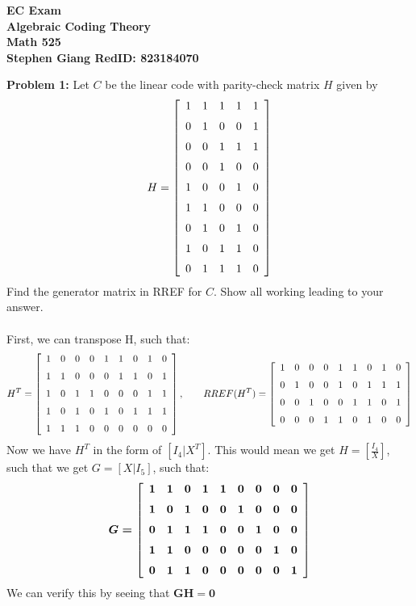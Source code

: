 \documentclass[11pt]{article}
\newcommand{\skipline}{\vspace{\baselineskip}}
\newenvironment{problem}[1]{\textbf{Problem #1: }}{\newpage}
\begin{document}
	
	\begin{center}
		\textbf{EC Exam} \\
		\textbf{Algebraic Coding Theory} \\
		\textbf{Math 525} \\
		\textbf{Stephen Giang RedID: 823184070} \\
		\skipline \skipline
	\end{center}
	
	\begin{problem}{1}
		Let $C$ be the linear code with parity-check matrix $H$ given by
		\[H =  \left[ \begin {array}{ccccc} 1&1&1&1&1\\ \noalign{\medskip}0&1&0&0&1
		\\ \noalign{\medskip}0&0&1&1&1\\ \noalign{\medskip}0&0&1&0&0
		\\ \noalign{\medskip}1&0&0&1&0\\ \noalign{\medskip}1&1&0&0&0
		\\ \noalign{\medskip}0&1&0&1&0\\ \noalign{\medskip}1&0&1&1&0
		\\ \noalign{\medskip}0&1&1&1&0\end {array} \right] 
		\]
		Find the generator matrix in RREF for $C$. Show all working leading to your answer.
		\\ \\
		First, we can transpose H, such that:
		\[H^T =  \left[ \begin {array}{ccccccccc} 1&0&0&0&1&1&0&1&0
		\\ \noalign{\medskip}1&1&0&0&0&1&1&0&1\\ \noalign{\medskip}1&0&1&1&0&0
		&0&1&1\\ \noalign{\medskip}1&0&1&0&1&0&1&1&1\\ \noalign{\medskip}1&1&1
		&0&0&0&0&0&0\end {array} \right], \qquad RREF(H^T) =  \left[ \begin {array}{ccccccccc} 1&0&0&0&1&1&0&1&0
		\\ \noalign{\medskip}0&1&0&0&1&0&1&1&1\\ \noalign{\medskip}0&0&1&0&0&1
		&1&0&1\\ \noalign{\medskip}0&0&0&1&1&0&1&0&0\end {array} \right]
		\]
		Now we have $H^T$ in the form of $[I_4 | X^T]$.  This would mean we get $H = \left[\frac{I_4}{X}\right]$, such that we get $G = [X | I_5]$, such that:
		\[\boldsymbol{G =   \left[ \begin {array}{ccccccccc} 1&1&0&1&1&0&0&0&0
		\\ \noalign{\medskip}1&0&1&0&0&1&0&0&0\\ \noalign{\medskip}0&1&1&1&0&0
		&1&0&0\\ \noalign{\medskip}1&1&0&0&0&0&0&1&0\\ \noalign{\medskip}0&1&1
		&0&0&0&0&0&1\end {array} \right] }  
		\]
		We can verify this by seeing that $\boldsymbol{GH = 0}$
	\end{problem}
	
\end{document}

